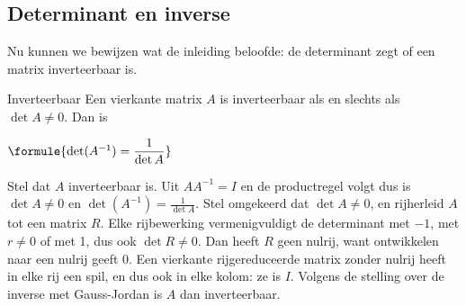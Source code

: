 
\subsection{Determinant en inverse}

Nu kunnen we bewijzen wat de inleiding beloofde: de determinant zegt of een matrix inverteerbaar is.

\begin{theorie}
\begin{stelling}{Inverteerbaar}
Een vierkante matrix $A$ is inverteerbaar als en slechts als $\det A \neq 0$. Dan is

\vspace{1mm}
\qquad $\formule{\det(A^{-1}) = \dfrac{1}{\det A}}$
\end{stelling}

\begin{bewijs}
Stel dat $A$ inverteerbaar is. Uit $AA^{-1} = I$ en de productregel volgt
dus is $\det A \neq 0$ en $\det(A^{-1}) = \frac{1}{\det A}$.
Stel omgekeerd dat $\det A \neq 0$, en rijherleid $A$ tot een matrix $R$. Elke rijbewerking vermenigvuldigt de determinant met $-1$, met $r \neq 0$ of met 1, dus ook $\det R \neq 0$. Dan heeft $R$ geen nulrij, want ontwikkelen naar een nulrij geeft 0. Een vierkante rijgereduceerde matrix zonder nulrij heeft in elke rij een spil, en dus ook in elke kolom: ze is $I$. Volgens de stelling over de inverse met Gauss-Jordan is $A$ dan inverteerbaar.
\end{bewijs}
\end{theorie}

